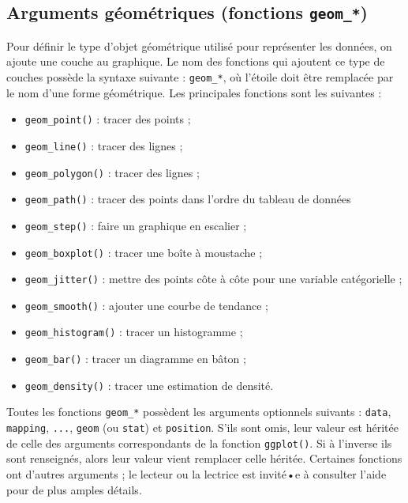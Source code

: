 \documentclass[
  11pt,
]{book}
\providecommand{\tightlist}{%
  \setlength{\itemsep}{0pt}\setlength{\parskip}{0pt}}
\numberwithin{equation}{section}
\numberwithin{countremarque}{section}
\begin{document}
\hypertarget{graphiques_ggplot_geom}{%
\subsection{\texorpdfstring{Arguments géométriques (fonctions \texttt{geom\_*})}{Arguments géométriques (fonctions geom\_*)}}\label{graphiques_ggplot_geom}}

Pour définir le type d'objet géométrique utilisé pour représenter les données, on ajoute une couche au graphique. Le nom des fonctions qui ajoutent ce type de couches possède la syntaxe suivante : \texttt{geom\_*}, où l'étoile doit être remplacée par le nom d'une forme géométrique. Les principales fonctions sont les suivantes :

\begin{itemize}
\tightlist
\item
  \texttt{geom\_point()} : tracer des points ;
\item
  \texttt{geom\_line()} : tracer des lignes ;
\item
  \texttt{geom\_polygon()} : tracer des lignes ;
\item
  \texttt{geom\_path()} : tracer des points dans l'ordre du tableau de données
\item
  \texttt{geom\_step()} : faire un graphique en escalier ;
\item
  \texttt{geom\_boxplot()} : tracer une boîte à moustache ;
\item
  \texttt{geom\_jitter()} : mettre des points côte à côte pour une variable catégorielle ;
\item
  \texttt{geom\_smooth()} : ajouter une courbe de tendance ;
\item
  \texttt{geom\_histogram()} : tracer un histogramme ;
\item
  \texttt{geom\_bar()} : tracer un diagramme en bâton ;
\item
  \texttt{geom\_density()} : tracer une estimation de densité.
\end{itemize}

Toutes les fonctions \texttt{geom\_*} possèdent les arguments optionnels suivants : \texttt{data}, \texttt{mapping}, \texttt{...}, \texttt{geom} (ou \texttt{stat}) et \texttt{position}. S'ils sont omis, leur valeur est héritée de celle des arguments correspondants de la fonction \texttt{ggplot()}. Si à l'inverse ils sont renseignés, alors leur valeur vient remplacer celle héritée. Certaines fonctions ont d'autres arguments ; le lecteur ou la lectrice est invité•e à consulter l'aide pour de plus amples détails.
\end{document}
